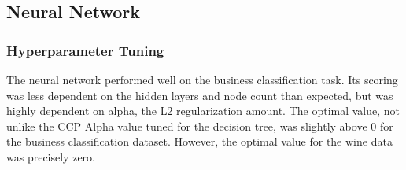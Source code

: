 \documentclass[
	letterpaper, %
]{jdf}
\begin{document}
\subsection{Neural Network}

\subsubsection{Hyperparameter Tuning}

The neural network performed well on the business classification task. Its scoring was less dependent on the hidden layers and node count than expected, but was highly dependent on alpha, the L2 regularization amount. The optimal value, not unlike the CCP Alpha value tuned for the decision tree, was slightly above 0 for the business classification dataset. However, the optimal value for the wine data was precisely zero.
\end{document}
